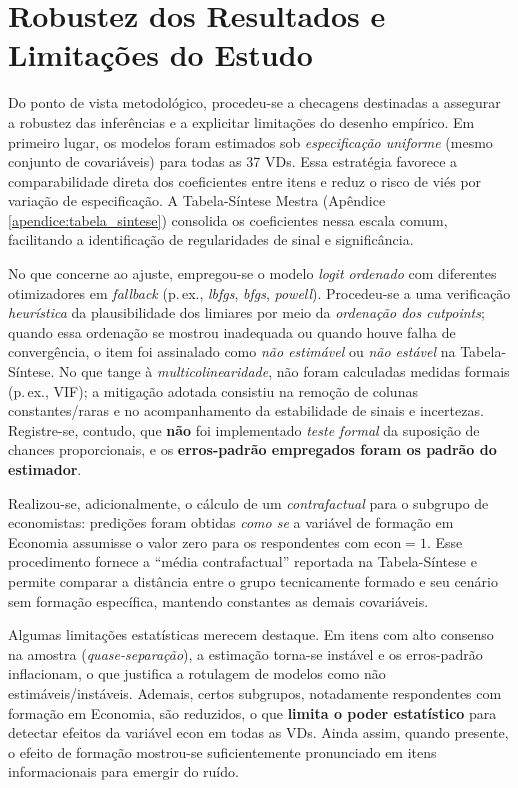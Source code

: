 \section{Robustez dos Resultados e Limitações do Estudo}
Do ponto de vista metodológico, procedeu-se a checagens destinadas a assegurar a robustez das inferências e a explicitar limitações do desenho empírico. Em primeiro lugar, os modelos foram estimados sob \textit{especificação uniforme} (mesmo conjunto de covariáveis) para todas as 37 VDs. Essa estratégia favorece a comparabilidade direta dos coeficientes entre itens e reduz o risco de viés por variação de especificação. A Tabela-Síntese Mestra (Apêndice \autoref{apendice:tabela_sintese}) consolida os coeficientes nessa escala comum, facilitando a identificação de regularidades de sinal e significância.

No que concerne ao ajuste, empregou-se o modelo \textit{logit ordenado} com diferentes otimizadores em \textit{fallback} (p.\,ex., \textit{lbfgs}, \textit{bfgs}, \textit{powell}). Procedeu-se a uma verificação \textit{heurística} da plausibilidade dos limiares por meio da \textit{ordenação dos cutpoints}; quando essa ordenação se mostrou inadequada ou quando houve falha de convergência, o item foi assinalado como \textit{não estimável} ou \textit{não estável} na Tabela-Síntese. No que tange à \textit{multicolinearidade}, não foram calculadas medidas formais (p.\,ex., VIF); a mitigação adotada consistiu na remoção de colunas constantes/raras e no acompanhamento da estabilidade de sinais e incertezas. Registre-se, contudo, que \textbf{não} foi implementado \textit{teste formal} da suposição de chances proporcionais, e os \textbf{erros-padrão empregados foram os padrão do estimador}.

Realizou-se, adicionalmente, o cálculo de um \textit{contrafactual} para o subgrupo de economistas: predições foram obtidas \textit{como se} a variável de formação em Economia assumisse o valor zero para os respondentes com \(\mathrm{econ}=1\). Esse procedimento fornece a ``média contrafactual'' reportada na Tabela-Síntese e permite comparar a distância entre o grupo tecnicamente formado e seu cenário sem formação específica, mantendo constantes as demais covariáveis.

Algumas limitações estatísticas merecem destaque. Em itens com alto consenso na amostra (\textit{quase-separação}), a estimação torna-se instável e os erros-padrão inflacionam, o que justifica a rotulagem de modelos como não estimáveis/instáveis. Ademais, certos subgrupos, notadamente respondentes com formação em Economia, são reduzidos, o que \textbf{limita o poder estatístico} para detectar efeitos da variável \(\mathrm{econ}\) em todas as VDs. Ainda assim, quando presente, o efeito de formação mostrou-se suficientemente pronunciado em itens informacionais para emergir do ruído.

